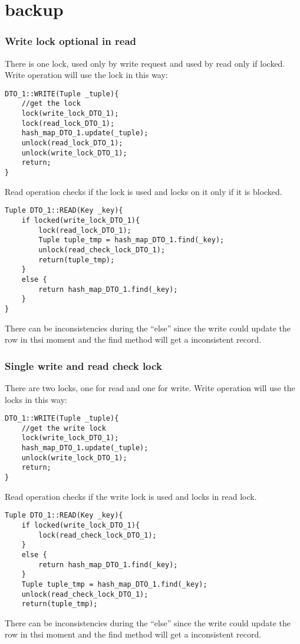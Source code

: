 \documentclass[a4paper]{article}
\begin{document}
\section{backup}

\subsubsection{Write lock optional in read}
There is one lock, used only by write request and used by read only if locked.
Write operation will use the lock in this way:

\begin{verbatim}
DTO_1::WRITE(Tuple _tuple){
    //get the lock
    lock(write_lock_DTO_1);
    lock(read_lock_DTO_1);
    hash_map_DTO_1.update(_tuple);
    unlock(read_lock_DTO_1);
    unlock(write_lock_DTO_1); 
    return;
}
\end{verbatim}

Read operation checks if the lock is used and locks on it only if it is
blocked.

\begin{verbatim}
Tuple DTO_1::READ(Key _key){
    if locked(write_lock_DTO_1){
        lock(read_lock_DTO_1);        
        Tuple tuple_tmp = hash_map_DTO_1.find(_key);
        unlock(read_check_lock_DTO_1);
        return(tuple_tmp);
    }
    else {
        return hash_map_DTO_1.find(_key);
    }
}
\end{verbatim}

There can be inconsistencies during the ``else'' since the write could update
the row in thsi moment and the find method will get a inconsistent record.

\subsubsection{Single write and read check lock}
There are two locks, one for read and one for write. Write operation will use
the locks in this way:

\begin{verbatim}
DTO_1::WRITE(Tuple _tuple){
    //get the write lock
    lock(write_lock_DTO_1);
    hash_map_DTO_1.update(_tuple);
    unlock(write_lock_DTO_1);
    return;
}
\end{verbatim}

Read operation checks if the write lock is used and locks in read lock.

\begin{verbatim}
Tuple DTO_1::READ(Key _key){
    if locked(write_lock_DTO_1){
        lock(read_check_lock_DTO_1);
    }
    else {
        return hash_map_DTO_1.find(_key);
    }
    Tuple tuple_tmp = hash_map_DTO_1.find(_key);
    unlock(read_check_lock_DTO_1);
    return(tuple_tmp);
\end{verbatim}

There can be inconsistencies during the ``else'' since the write could update
the row in thsi moment and the find method will get a inconsistent record.
\end{document}
